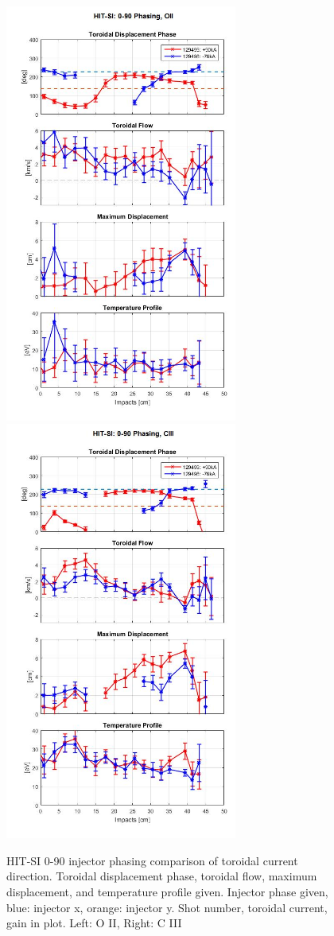 \documentclass{AIAA}
\begin{document}
\begin{figure}
\includegraphics[width=3in]{129499_OII_ComparisonError_DataSuppression_2}\nolinebreak
\includegraphics[width=3in]{129499_CIII_ComparisonError_DataSuppression_2}\caption{HIT-SI 0-90 injector phasing comparison of toroidal current direction. Toroidal displacement phase, toroidal flow, maximum displacement, and temperature profile given. Injector phase given, blue: injector x, orange: injector y. Shot number, toroidal current, gain in plot. Left: O II, Right: C III}\label{Fig::PosNeg_HIT_SI}
\end{figure}
\end{document}
